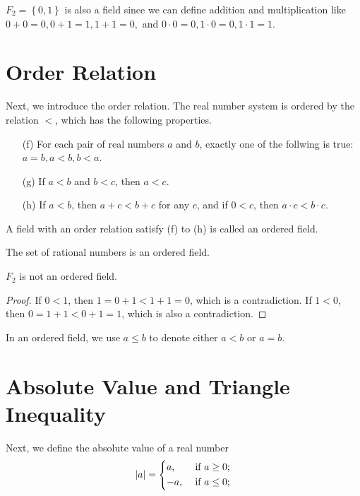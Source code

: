 \begin{eg}
  \(F_2 = \left\{ 0,1 \right\} \) is also a field since we can define addition and multiplication like \(0+0=0, 0+1=1,1+1=0,\) and \(0 \cdot 0 = 0, 1 \cdot 0 = 0, 1 \cdot 1 = 1\).   
\end{eg}

\section{Order Relation}
Next, we introduce the order relation. The real number system is ordered by the relation \(<\), which has the following properties. 
\begin{itemize}
  \item [(f)] For each pair of real numbers \(a\) and \(b\), exactly one of the follwing is true: \(a=b, a < b, b < a\).
  \item [(g)] If \(a<b\) and \(b<c\), then \(a<c\). 
  \item [(h)] If \(a<b\), then \(a+c < b+c\) for any \(c\), and if \(0<c\), then \(a \cdot c < b \cdot c\).  
\end{itemize}

\begin{definition}
  A field with an order relation satisfy (f) to (h) is called an ordered field.
\end{definition}

\begin{eg}
  The set of rational numbers is an ordered field.
\end{eg}

\begin{eg}
  \(F_2\) is not an ordered field. 
\end{eg}
\begin{proof}
  If \(0<1\), then \(1=0+1 < 1+1=0\), which is a contradiction. If \(1<0\), then \(0=1+1<0+1=1\), which is also a contradiction.    
\end{proof}

\begin{notation}
  In an ordered field, we use \(a \le b\) to denote either \(a<b\) or \(a=b\).   
\end{notation}
\section{Absolute Value and Triangle Inequality}
Next, we define the absolute value of a real number 
\[
  \vert a \vert = \begin{dcases}
   a , &\text{ if } a \ge 0  ;\\
   -a , &\text{ if } a \le 0 ;
  \end{dcases} 
\]

